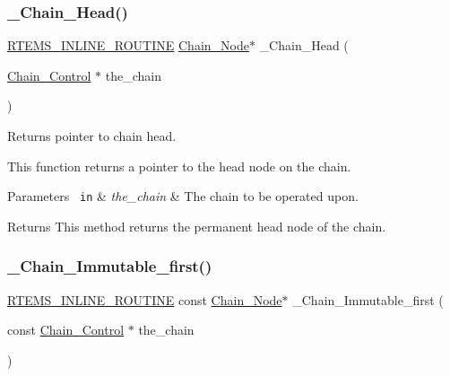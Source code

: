 \subsubsection{\texorpdfstring{\_Chain\_Head()}{\_Chain\_Head()}}
{\footnotesize\ttfamily \mbox{\hyperlink{group__RTEMSScoreBaseDefs_gac216239df231d5dbd15e3520b0b9313f}{R\+T\+E\+M\+S\+\_\+\+I\+N\+L\+I\+N\+E\+\_\+\+R\+O\+U\+T\+I\+NE}} \mbox{\hyperlink{group__RTEMSScoreChain_ga0dd4bfcca1ac7f90de2842e447846d3d}{Chain\+\_\+\+Node}}$\ast$ \+\_\+\+Chain\+\_\+\+Head (\begin{DoxyParamCaption}\item[{\mbox{\hyperlink{unionChain__Control}{Chain\+\_\+\+Control}} $\ast$}]{the\+\_\+chain }\end{DoxyParamCaption})}



Returns pointer to chain head. 

This function returns a pointer to the head node on the chain.


\begin{DoxyParams}[1]{Parameters}
\mbox{\texttt{ in}}  & {\em the\+\_\+chain} & The chain to be operated upon.\\
\hline
\end{DoxyParams}
\begin{DoxyReturn}{Returns}
This method returns the permanent head node of the chain. 
\end{DoxyReturn}
\mbox{\label{group__RTEMSScoreChain_gaafac27cae9babb0434c0c4253e9bcc25}} 
\subsubsection{\texorpdfstring{\_Chain\_Immutable\_first()}{\_Chain\_Immutable\_first()}}
{\footnotesize\ttfamily \mbox{\hyperlink{group__RTEMSScoreBaseDefs_gac216239df231d5dbd15e3520b0b9313f}{R\+T\+E\+M\+S\+\_\+\+I\+N\+L\+I\+N\+E\+\_\+\+R\+O\+U\+T\+I\+NE}} const \mbox{\hyperlink{group__RTEMSScoreChain_ga0dd4bfcca1ac7f90de2842e447846d3d}{Chain\+\_\+\+Node}}$\ast$ \+\_\+\+Chain\+\_\+\+Immutable\+\_\+first (\begin{DoxyParamCaption}\item[{const \mbox{\hyperlink{unionChain__Control}{Chain\+\_\+\+Control}} $\ast$}]{the\+\_\+chain }\end{DoxyParamCaption})}



